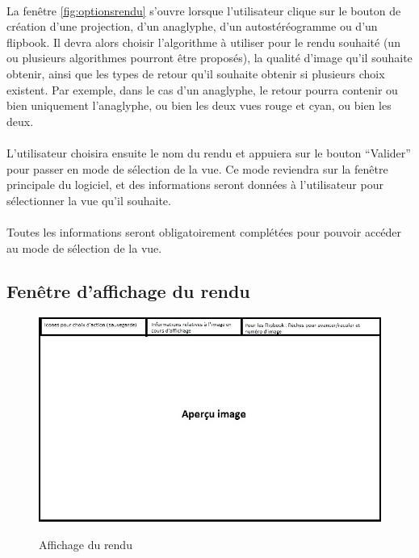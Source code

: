 \paragraph{}
La fenêtre \ref{fig:optionsrendu} s’ouvre lorsque l’utilisateur clique sur le bouton de création d’une projection, d’un anaglyphe, d’un autostéréogramme ou d’un flipbook. Il devra alors choisir l’algorithme à utiliser pour le rendu souhaité (un ou plusieurs algorithmes pourront être proposés), la qualité d’image qu’il souhaite obtenir, ainsi que les types de retour qu’il souhaite obtenir si plusieurs choix existent. Par exemple, dans le cas d’un anaglyphe, le retour pourra contenir ou bien uniquement l’anaglyphe, ou bien les deux vues rouge et cyan, ou bien les deux.

\paragraph{}
L’utilisateur choisira ensuite le nom du rendu et appuiera sur le bouton ``Valider'' pour passer en mode de sélection de la vue. Ce mode reviendra sur la fenêtre principale du logiciel, et des informations seront données à l’utilisateur pour sélectionner la vue qu’il souhaite.

\paragraph{}
Toutes les informations seront obligatoirement complétées pour pouvoir accéder au mode de sélection de la vue.

\subsection{Fenêtre d'affichage du rendu}

\begin{figure}[H]
  \centering
  \includegraphics[scale=0.6]{apercuimage}
  \label{fig:apercu}
  \caption{Affichage du rendu}
\end{figure}

